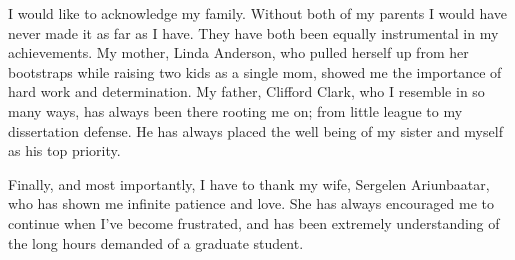 \begin{acknowledgements}
I would like to acknowledge my family. Without both of my parents I would have never made it as far as I have. They have both been equally instrumental in my achievements. My mother, Linda Anderson, who pulled herself up from her bootstraps while raising two kids as a single mom, showed me the importance of hard work and determination.  My father, Clifford Clark, who I resemble in so many ways, has always been there rooting me on; from little league to my dissertation defense. He has always placed the well being of my sister and myself as his top priority. 

Finally, and most importantly, I have to thank my wife, Sergelen Ariunbaatar, who has shown me infinite patience and love. She has always encouraged me to continue when I've become frustrated, and has been extremely understanding of the long hours demanded of a graduate student.   


\end{acknowledgements}
